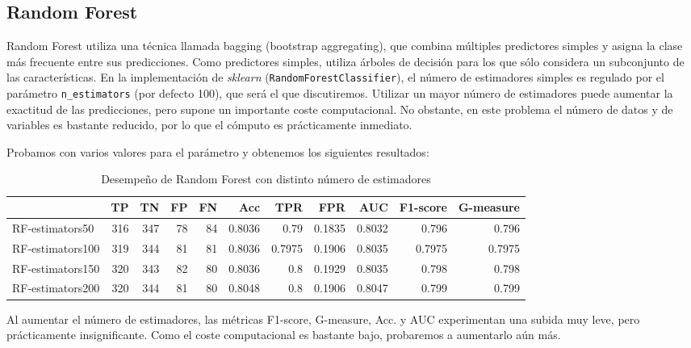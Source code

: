 \documentclass{article}
\begin{document}
\subsection{Random Forest}

Random Forest utiliza una técnica llamada bagging (bootstrap
aggregating), que combina múltiples predictores simples y asigna la
clase más frecuente entre sus predicciones. Como predictores simples,
utiliza árboles de decisión para los que sólo considera un subconjunto
de las características. En la implementación de \textit{sklearn}
(\texttt{RandomForestClassifier}), el número de estimadores simples es
regulado por el parámetro \texttt{n\_estimators} (por defecto 100),
que será el que discutiremos. Utilizar un mayor número de estimadores
puede aumentar la exactitud de las predicciones, pero supone un
importante coste computacional. No obstante, en este problema el
número de datos y de variables es bastante reducido, por lo que el
cómputo es prácticamente inmediato.

Probamos con varios valores para el parámetro y obtenemos los
siguientes resultados:

\begin{table}[H]
\centering
\caption{Desempeño de Random Forest con distinto número de estimadores}
\label{tab:tuning-rf}
\begin{tabular}{|lrrrrrrrrrr|}
\hline
 & TP & TN & FP & FN & Acc & TPR & FPR & AUC & F1-score & G-measure\\ \hline
RF-estimators50 & 316 & 347 & 78 & 84 & 0.8036 & 0.79 & 0.1835 & 0.8032 & 0.796 & 0.796\\
RF-estimators100 & 319 & 344 & 81 & 81 & 0.8036 & 0.7975 & 0.1906 & 0.8035 & 0.7975 & 0.7975\\
RF-estimators150 & 320 & 343 & 82 & 80 & 0.8036 & 0.8 & 0.1929 & 0.8035 & 0.798 & 0.798\\
RF-estimators200 & 320 & 344 & 81 & 80 & 0.8048 & 0.8 & 0.1906 & 0.8047 & 0.799 & 0.799\\
\hline
\end{tabular}
\end{table}

Al aumentar el número de estimadores, las métricas F1-score,
G-measure, Acc. y AUC experimentan una subida muy leve, pero
prácticamente insignificante. Como el coste computacional es bastante
bajo, probaremos a aumentarlo aún más.
\end{document}
